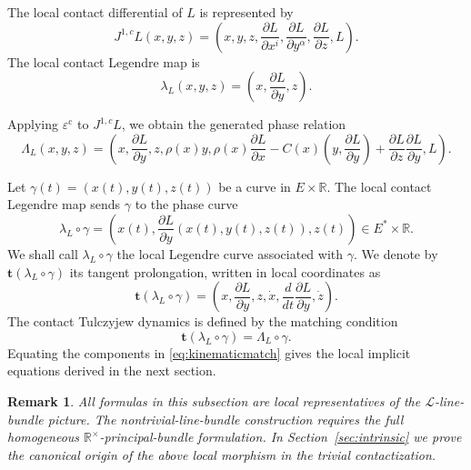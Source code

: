 \documentclass[10pt,a4paper]{amsart}
\newtheorem{remark}[theorem]{Remark}
\newcommand{\R}{\mathbb{R}}
\newcommand{\epsc}{\varepsilon^{\mathrm c}}
\begin{document}
The local contact differential of \(L\) is represented by
\[
J^{1,c}L(x,y,z)
=
\left(
 x,y,z,
 \frac{\partial L}{\partial x^i},
 \frac{\partial L}{\partial y^\alpha},
 \frac{\partial L}{\partial z},
 L
\right).
\]
The local contact Legendre map is
\begin{equation}
    \label{CLM}
        \lambda_L(x,y,z)
        =
        \left(
        x,\frac{\partial L}{\partial y},z
        \right).\end{equation}

Applying \(\epsc\) to \(J^{1,c}L\), we obtain the generated phase relation
\[
\Lambda_L(x,y,z)
=
\left(
 x,\frac{\partial L}{\partial y},z,
 \rho(x)y,
 \rho(x)\frac{\partial L}{\partial x}
 -
 C(x)\left(y,\frac{\partial L}{\partial y}\right)
 +
 \frac{\partial L}{\partial z}\frac{\partial L}{\partial y},
 L
\right).
\]

Let $\gamma(t)=(x(t),y(t),z(t))$ be a curve in \(E\times\R\). The local contact Legendre map sends
\(\gamma\) to the phase curve
\[
        \lambda_L\circ\gamma
        =
        \left(
        x(t),
        \frac{\partial L}{\partial y}(x(t),y(t),z(t)),
        z(t)
        \right)
        \in E^*\times\R .
\]
We shall call $\lambda_L\circ\gamma$ the local Legendre curve associated with \(\gamma\).
We denote by $\mathbf t(\lambda_L\circ\gamma)$ its tangent
prolongation, written in local coordinates as
\begin{equation}\label{tangprolong}
 \mathbf t(\lambda_L\circ\gamma)
        =
        \left(
        x,
        \frac{\partial L}{\partial y},
        z,
        \dot x,
        \frac{d}{dt}\frac{\partial L}{\partial y},
        \dot z
        \right).
\end{equation}
The contact Tulczyjew dynamics is defined by the matching condition
\begin{equation}
        \mathbf t(\lambda_L\circ\gamma)
        =
        \Lambda_L\circ\gamma .
\label{eq:kinematicmatch}
\end{equation}
Equating the components in \eqref{eq:kinematicmatch} gives the local
implicit equations derived in the next section.

\begin{remark}
All formulas in this subsection are local representatives of the
\(\mathcal L\)-line-bundle picture. The nontrivial-line-bundle construction
requires the full homogeneous \(\mathbb R^\times\)-principal-bundle formulation. In
Section~\ref{sec:intrinsic} we prove the canonical origin of the above local morphism in the
trivial contactization.
\end{remark}
\end{document}
